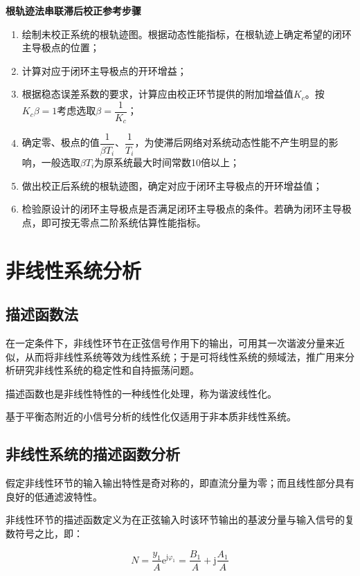 \documentclass[cn, blue, normal, 12pt]{elegantnote}
\begin{document}
\textbf{根轨迹法串联滞后校正参考步骤}

\begin{enumerate}
    \setlength{\itemsep}{6pt}
    \item 绘制未校正系统的根轨迹图。根据动态性能指标，在根轨迹上确定希望的闭环主导极点的位置；
    \item 计算对应于闭环主导极点的开环增益；
    \item 根据稳态误差系数的要求，计算应由校正环节提供的附加增益值$K_c$。按$K_c\beta=1$考虑选取$\beta=\dfrac{1}{K_c}$；
    \item 确定零、极点的值$\dfrac{1}{\beta T_i}$、$\dfrac{1}{T_i}$，为使滞后网络对系统动态性能不产生明显的影响，一般选取$\beta T_i$为原系统最大时间常数10倍以上；
    \item 做出校正后系统的根轨迹图，确定对应于闭环主导极点的开环增益值；
    \item 检验原设计的闭环主导极点是否满足闭环主导极点的条件。若确为闭环主导极点，即可按无零点二阶系统估算性能指标。
\end{enumerate}

\section{非线性系统分析}

\subsection{描述函数法}

在一定条件下，非线性环节在正弦信号作用下的输出，可用其一次谐波分量来近似，从而将非线性系统等效为线性系统；于是可将线性系统的频域法，推广用来分析研究非线性系统的稳定性和自持振荡问题。

描述函数也是非线性特性的一种线性化处理，称为谐波线性化。

基于平衡态附近的小信号分析的线性化仅适用于非本质非线性系统。

\subsection{非线性系统的描述函数分析}

假定非线性环节的输入输出特性是奇对称的，即直流分量为零；而且线性部分具有良好的低通滤波特性。

非线性环节的描述函数定义为在正弦输入时该环节输出的基波分量与输入信号的复数符号之比，即：

\begin{equation}
    N=\frac{y_1}{A}\mathrm{e}^{\mathrm{j}\varphi_1}=\frac{B_1}{A}+\mathrm{j}\frac{A_1}{A}
\end{equation}
\end{document}
